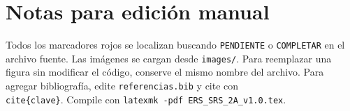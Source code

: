 \documentclass[12pt,journal,onecolumn]{IEEEtran}
\begin{document}
\section{Notas para edición manual}
Todos los marcadores rojos se localizan buscando \texttt{PENDIENTE} o \texttt{COMPLETAR} en el archivo fuente. Las imágenes se cargan desde \texttt{images/}. Para reemplazar una figura sin modificar el código, conserve el mismo nombre del archivo. Para agregar bibliografía, edite \texttt{referencias.bib} y cite con \texttt{\\cite\{clave\}}. Compile con \texttt{latexmk -pdf ERS\_SRS\_2A\_v1.0.tex}.

\nocite{*}


\end{document}
